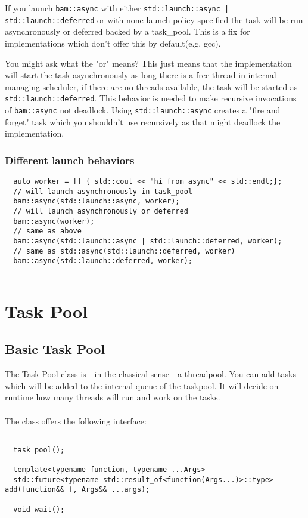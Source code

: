 \documentclass[11pt, a4paper]{article}
\begin{document}
If you launch \texttt{bam::async} with either \texttt{std::launch::async | std::launch::deferred} or with none launch policy specified the task will be run asynchronously or deferred backed by a task\_pool. This is a fix for implementations which don't offer this by default(e.g. gcc). 

You might ask what the "or" means? This just means that the implementation will start the task asynchronously as long there is a free thread in internal managing scheduler, if there are no threads available, the task will be started as \texttt{std::launch::deferred}. This behavior is needed to make recursive invocations of \texttt{bam::async} not deadlock. Using \texttt{std::launch::async} creates a "fire and forget" task which you shouldn't use recursively as that might deadlock the implementation.

\subsubsection{ Different launch behaviors} 

\begin{lstlisting}
  auto worker = [] { std::cout << "hi from async" << std::endl;};
  // will launch asynchronously in task_pool
  bam::async(std::launch::async, worker); 
  // will launch asynchronously or deferred
  bam::async(worker);
  // same as above
  bam::async(std::launch::async | std::launch::deferred, worker);
  // same as std::async(std::launch::deferred, worker)
  bam::async(std::launch::deferred, worker); 


\end{lstlisting}

\section{Task Pool}
\subsection{ Basic Task Pool}

The Task Pool class is - in the classical sense - a threadpool. You can add tasks which will be added to the internal queue of the taskpool. It will decide on runtime how many threads will run and work on the tasks. \\\\
The class offers the following interface:\\

\begin{lstlisting}

  task_pool();

  template<typename function, typename ...Args>
  std::future<typename std::result_of<function(Args...)>::type> add(function&& f, Args&& ...args);

  void wait();

\end{lstlisting}
\end{document}
